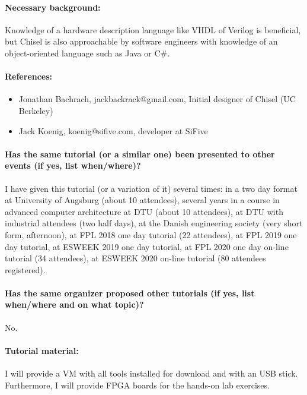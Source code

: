 \documentclass{article}
\begin{document}
 \paragraph{Necessary background:}

Knowledge of a hardware description language like VHDL of Verilog is beneficial, but Chisel is also
approachable by software engineers with knowledge of an object-oriented language such as Java or C\#.

 \paragraph{References:}

\begin{itemize}
\item Jonathan Bachrach, jackbackrack@gmail.com, Initial designer of Chisel (UC Berkeley)
\item Jack Koenig, koenig@sifive.com, developer at SiFive
\end{itemize}

\paragraph{Has the same tutorial (or a similar one) been presented to other events (if yes, list when/where)?}

I have given this tutorial (or a variation of it) several times:
in a two day format at University of Augsburg (about 10 attendees), several years
in a course in advanced computer architecture at DTU (about 10 attendees),
at DTU with industrial attendees (two half days),
at the Danish engineering society (very short form, afternoon),
at FPL 2018 one day tutorial (22 attendees), at FPL 2019 one day tutorial,
at ESWEEK 2019 one day tutorial, at FPL 2020 one day on-line tutorial (34 attendees),
at ESWEEK 2020 on-line tutorial (80 attendees registered).

\paragraph{Has the same organizer proposed other tutorials (if yes, list when/where and on what topic)?}

No.

 \paragraph{Tutorial material:} I will provide a VM with all tools installed for download and with an USB stick. Furthermore, I will provide FPGA boards for the hands-on lab exercises.
 
\end{document}
